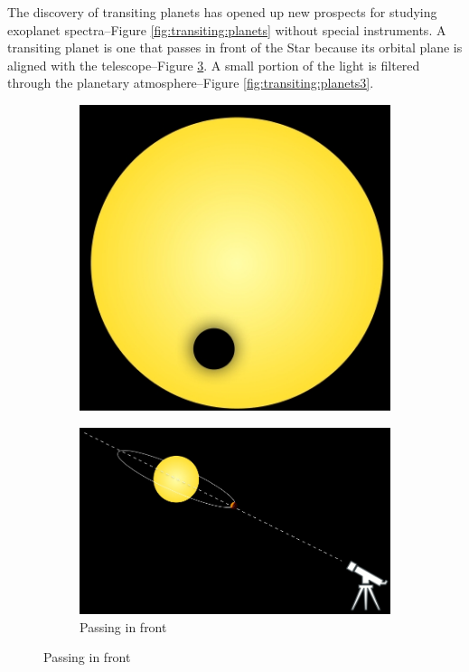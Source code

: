 \documentclass[]{article}
\begin{document}
The discovery of transiting planets has opened up new prospects for studying exoplanet spectra--Figure \ref{fig:transiting:planets} without special instruments. A transiting planet is one that passes in front of the Star because its orbital plane is aligned with the telescope--Figure \ref{fig:transiting:planets2}. A small portion of the light is filtered through the planetary atmosphere--Figure \ref{fig:transiting:planets3}.
\begin{figure}[H]
	\caption{Transiting Planets}\label{fig:transiting:planets}
	\begin{subfigure}[t]{0.3\textwidth}
		\caption{}\label{fig:transiting:planets1}
		\includegraphics[width=\textwidth]{TransitingPlanets1}
	\end{subfigure}
	\begin{subfigure}[t]{0.3\textwidth}
		\caption{Passing in front}\label{fig:transiting:planets2}
		\includegraphics[width=\textwidth]{TransitingPlanets2}

\end{subfigure}
\end{figure}
\end{document}
